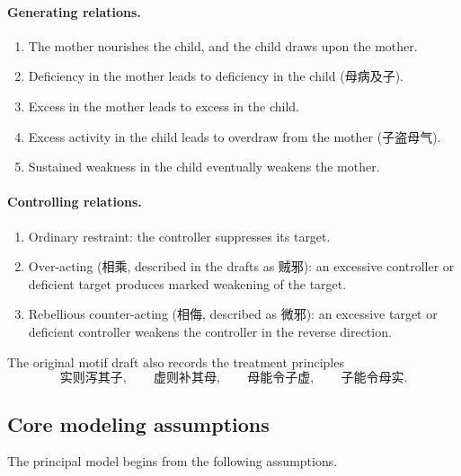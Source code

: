 \documentclass[11pt, reqno]{amsart}
\theoremstyle{definition}
\theoremstyle{remark}
\begin{document}
	\paragraph{Generating relations.}
	\begin{enumerate}[label=\arabic*.,leftmargin=2.5em]
		\item The mother nourishes the child, and the child draws upon the mother.
		\item Deficiency in the mother leads to deficiency in the child
		(母病及子).
		\item Excess in the mother leads to excess in the child.
		\item Excess activity in the child leads to overdraw from the mother
		(子盗母气).
		\item Sustained weakness in the child eventually weakens the mother.
	\end{enumerate}
	
	\paragraph{Controlling relations.}
	\begin{enumerate}[label=\arabic*.,leftmargin=2.5em,start=6]
		\item Ordinary restraint: the controller suppresses its target.
		\item Over-acting (相乘, described in the drafts as 贼邪): an excessive
		controller or deficient target produces marked weakening of the target.
		\item Rebellious counter-acting (相侮, described as 微邪): an excessive
		target or deficient controller weakens the controller in the reverse
		direction.
	\end{enumerate}
	
	The original motif draft also records the treatment principles
	\[
	\text{实则泻其子},
	\qquad
	\text{虚则补其母},
	\qquad
	\text{母能令子虚},
	\qquad
	\text{子能令母实}.
	\]
	
	
	\subsection{Core modeling assumptions}
	
	The principal model begins from the following assumptions.
	
\end{document}
